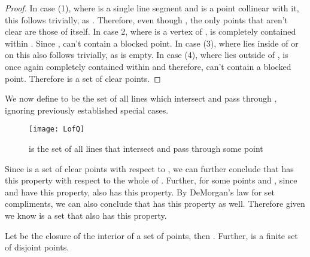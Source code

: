 \documentclass{cccg12}
\begin{document}
\begin{proof}
In case (1), where  is a single line segment and  is a point collinear with it, this follows trivially, as . Therefore, even though , the only points that aren't clear are those of  itself. 
In case 2, where  is a vertex of ,  is completely contained within . 
	Since ,  can't 
	contain a blocked point. 
In case (3), where  lies inside of or on  this also follows trivially, as  is empty. 
In case (4), where  lies outside of ,  is once again completely contained within  and therefore,  can't contain a blocked point. 
Therefore  is a set of clear points.
\end{proof}

We now define  to be the set of all lines which intersect  and pass through , ignoring previously established special cases.

\begin{figure}[ht]
  \centering
  \texttt{[image: LofQ]}
  \caption{ is the set of all lines that intersect  and pass through some point }
  \label{fig:LofQ}
\end{figure} 

Since  is a set of clear points with respect to , we can further conclude that  has this property with respect to the whole of . Further, for some points  and , since  and  have this property,  also has this property. By DeMorgan's law for set compliments, we can also conclude that  has this property as well. Therefore given  we know  is a set that also has this property. 

\begin{theorem}
\label{thm:coverageComputation}
Let  be the closure of the interior of a set of points, then . Further,  is a finite set of disjoint points.
\end{theorem}
\end{document}
